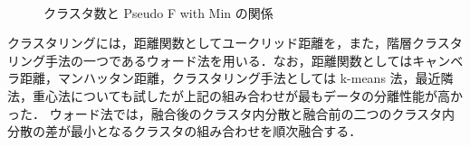 \documentclass[technicalreport]{ieicej}
\begin{document}
\begin{figure}[tb]
\begin{center}
~
\caption{クラスタ数と Pseudo F with Min の関係}
\label{PseudoFwithMinPlot}
\end{center}
\end{figure}
クラスタリングには，距離関数としてユークリッド距離を，また，階層クラスタリング手法の一つであるウォード法\cite{murtagh2014ward}を用いる．なお，距離関数としてはキャンベラ距離，マンハッタン距離，クラスタリング手法としては k-means 法，最近隣法，重心法についても試したが上記の組み合わせが最もデータの分離性能が高かった．
ウォード法では，融合後のクラスタ内分散と融合前の二つのクラスタ内分散の差が最小となるクラスタの組み合わせを順次融合する．
\end{document}
